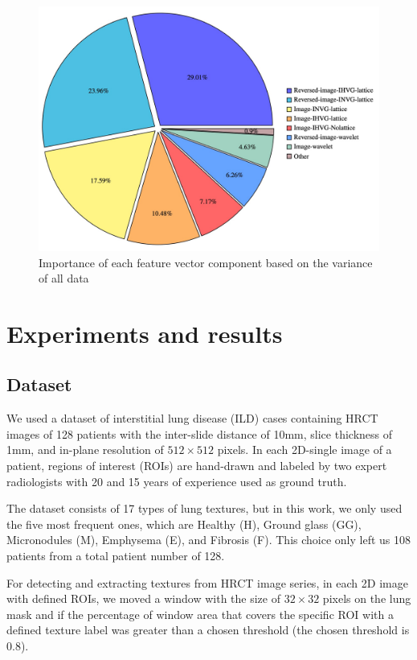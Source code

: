 \documentclass[conference]{IEEEtran}
\begin{document}
\begin{figure}[tbh]
 \includegraphics[width=1\linewidth]{images/PCA_piechart.png}
   \caption{Importance of each feature vector component based on the variance of all data}
 \label{fig: PCA1}
\end{figure}


\section{\large{Experiments and results}}
\subsection{\textbf{Dataset}}
We used a dataset of interstitial lung disease (ILD) \cite{dataset} cases containing HRCT images of 128 patients with the inter-slide distance of 10mm, slice thickness of 1mm, and in-plane resolution of $512\times 512$ pixels. In each 2D-single image of a patient, regions of interest (ROIs) are hand-drawn and labeled by two expert radiologists with 20 and 15 years of experience used as ground truth. 

The dataset consists of 17 types of lung textures, but in this work, we only used the five most frequent ones, which are Healthy (H), Ground glass (GG), Micronodules (M), Emphysema (E), and Fibrosis (F). This choice only left us 108 patients from a total patient number of 128.

For detecting and extracting textures from HRCT image series, in each 2D image with defined ROIs, we moved a window with the size of $32 \times 32 $ pixels on the lung mask and if the percentage of window area that covers the specific ROI with a defined texture label was greater than a chosen threshold (the chosen threshold is 0.8).
\end{document}
